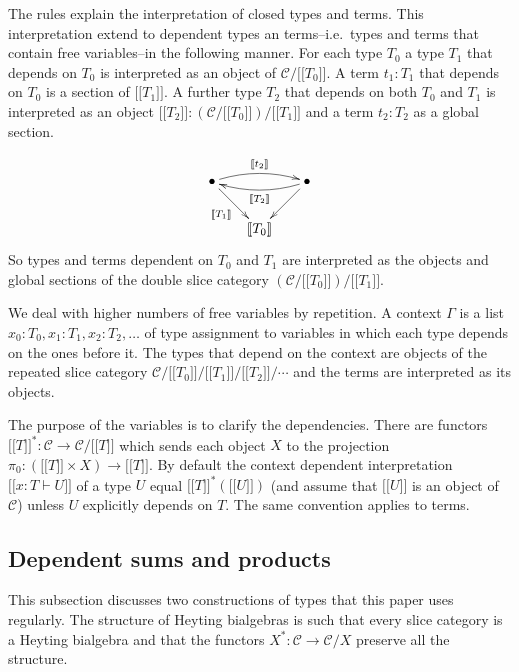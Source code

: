 \documentclass{tac}
\newcommand\hide[1]{}
\newcommand\cat\mathcal
\newcommand\ri{^*}
\newcommand\of{:}
\newcommand\db[1]{{[\![}#1{]\!]}}
\begin{document}
The rules explain the interpretation of closed types and terms. This interpretation extend to dependent types an terms--i.e.\ types and terms that contain free variables--in the following manner. For each type $T_0$ a type $T_1$ that depends on $T_0$ is interpreted as an object of $\cat C/\db{T_0}$. A term $t_1\of T_1$ that depends on $T_0$ is a section of $\db{T_1}$. A further type $T_2$ that depends on both $T_0$ and $T_1$ is interpreted as an object $\db{T_2}\of(\cat C/\db{T_0})/\db{T_1}$ and a term $t_2\of T_2$ as a global section.
\hide{\[\xymatrix{
& \bullet\ar[dl]^{\db{T_2}}\ar[d]\\ 
\bullet\ar[r]_{\db{T_1}}\ar@/^/[ur]^{\db{t_2}} & \db{T_0}
}\]}
\[\xy
(0,12)*+{\bullet} = "top left",(24,12)*+{\bullet} = "top right",(12,0)*+{\db{T_0}} = "bottom"
\ar "top right";"bottom" \ar_{\db{T_1}} "top left";"bottom" 
\ar@/^/@{->}^{\db{T_2}} "top right";"top left"
\ar@/^/@{->}^{\db{t_2}} "top left";"top right"
\endxy\]
So types and terms dependent on $T_0$ and $T_1$ are interpreted as the objects and global sections of the double slice category $(\cat C/\db{T_0})/\db{T_1}$.

We deal with higher numbers of free variables by repetition. A context $\Gamma$ is a list $x_0\of T_0,x_1\of T_1,x_2\of T_2,\dots$ of type assignment to variables in which each type depends on the ones before it. The types that depend on the context are objects of the repeated slice category $\cat C/\db{T_0}/\db{T_1}/\db{T_2}/\dotsm$ and the terms are interpreted as its objects. 

The purpose of the variables is to clarify the dependencies. There are functors $\db T\ri\of\cat C\to \cat C/\db T$ which sends each object $X$ to the projection $\pi_0\of(\db T\times X)\to \db T$. By default the context dependent interpretation $\db{x\of T\vdash U}$ of a type $U$ equal $\db T\ri(\db U)$ (and assume that $\db U$ is an object of $\cat C$) unless $U$ explicitly depends on $T$. The same convention applies to terms.

\subsection{Dependent sums and products}
This subsection discusses two constructions of types that this paper uses regularly. The structure of Heyting bialgebras is such that every slice category is a Heyting bialgebra and that the functors $X\ri\of\cat C\to\cat C/X$ preserve all the structure.

\end{document}
